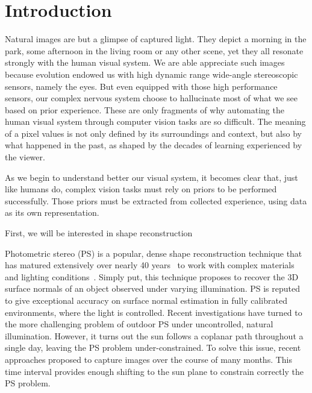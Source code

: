 \chapter*{Introduction}         %

Natural images are but a glimpse of captured light. They depict a morning in the park, some afternoon in the living room or any other scene, yet they all resonate strongly with the human visual system. We are able appreciate such images because evolution endowed us with high dynamic range wide-angle stereoscopic sensors, namely the eyes. But even equipped with those high performance sensors, our complex nervous system choose to hallucinate most of what we see based on prior experience. These are only fragments of why automating the human visual system through computer vision tasks are so difficult. The meaning of a pixel values is not only defined by its surroundings and context, but also by what happened in the past, as shaped by the decades of learning experienced by the viewer.

As we begin to understand better our visual system, it becomes clear that, just like humans do, complex vision tasks must rely on priors to be performed successfully. Those priors must be extracted from collected experience, using data as its own representation.

First, we will be interested in shape reconstruction



Photometric stereo (PS) is a popular, dense shape reconstruction technique that has matured extensively over nearly 40 years~\cite{woodham-opteng-80} to work with complex materials and lighting conditions~\cite{alldrin-cvpr-08,basri-ijcv-07,johnson-cvpr-11,oxholm-eccv-12}.
Simply put, this technique proposes to recover the 3D surface normals of an object observed under varying illumination.
PS is reputed to give exceptional accuracy on surface normal estimation in fully calibrated environments, where the light is controlled.
Recent investigations have turned to the more challenging problem of outdoor PS under uncontrolled, natural illumination. However, it turns out the sun follows a coplanar path throughout a single day, leaving the PS problem under-constrained. To solve this issue, recent approaches proposed to capture images over the course of many months\cite{ackermann-cvpr-12,abrams-eccv-12}. This time interval provides enough shifting to the sun plane to constrain correctly the PS problem.

